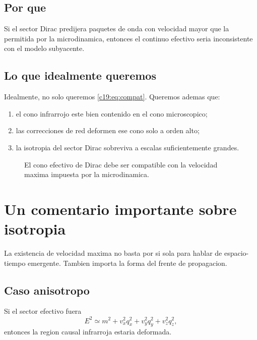 \subsection{Por que}
Si el sector Dirac predijera paquetes de onda con velocidad mayor que la permitida por la microdinamica, entonces el continuo efectivo seria inconsistente con el modelo subyacente.

\subsection{Lo que idealmente queremos}
Idealmente, no solo queremos \eqref{c19:eq:compat}. Queremos ademas que:
\begin{enumerate}[label=\arabic*.]
    \item el cono infrarrojo este bien contenido en el cono microscopico;
    \item las correcciones de red deformen ese cono solo a orden alto;
    \item la isotropia del sector Dirac sobreviva a escalas suficientemente grandes.
\end{enumerate}

\begin{figure}[h!]
\centering
{}
\caption{El cono efectivo de Dirac debe ser compatible con la velocidad maxima impuesta por la microdinamica.}
\end{figure}

\section{Un comentario importante sobre isotropia}
La existencia de velocidad maxima no basta por si sola para hablar de espacio-tiempo emergente. Tambien importa la forma del frente de propagacion.

\subsection{Caso anisotropo}
Si el sector efectivo fuera
\begin{equation}
E^2 \simeq m^2 + v_x^2 q_x^2 + v_y^2 q_y^2 + v_z^2 q_z^2,
\end{equation}
entonces la region causal infrarroja estaria deformada.

